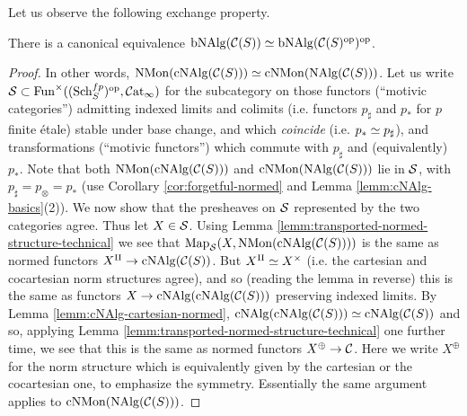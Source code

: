 \documentclass{amsart}
\numberwithin{proposition}{section}
\numberwithin{equation}{section}
\def\NMon{\mathrm{NMon}}
\def\cNMon{\mathrm{cNMon}}
\def\cNAlg{\mathrm{cNAlg}}
\def\bNAlg{\mathrm{bNAlg}}
\begin{document}
Let us observe the following exchange property.
\begin{lemma} \label{lemm:bNAlg-exchange}
There is a canonical equivalence $\bNAlg(\scr C(S)) \wequi \bNAlg(\scr C(S)^\op)^\op$.
\end{lemma}
\begin{proof}
In other words, $\NMon(\cNAlg(\scr C(S))) \wequi \cNMon(\NAlg(\scr C(S)))$.
Let us write $\mathcal S \subset \mathrm{Fun}^\times((\mathrm{S}\mathrm{ch}{}_S^{fp})^{\mathrm{op}}, \mathcal{C}\mathrm{at}{}_\infty)$ for the subcategory on those functors (``motivic categories'') admitting indexed limits and colimits (i.e. functors $p_\sharp$ and $p_*$ for $p$ finite étale) stable under base change, and which \emph{coincide} (i.e. $p_* \simeq p_\sharp$), and transformations (``motivic functors'') which commute with $p_\sharp$ and (equivalently) $p_*$.
Note that both $\NMon(\cNAlg(\scr C(S)))$ and $\cNMon(\NAlg(\scr C(S)))$ lie in $\mathcal S$, with $p_\sharp = p_\otimes = p_*$ (use Corollary \ref{cor:forgetful-normed} and Lemma \ref{lemm:cNAlg-basics}(2)).
We now show that the presheaves on $\mathcal S$ represented by the two categories agree.
Thus let $X \in \mathcal S$.
Using Lemma \ref{lemm:transported-normed-structure-technical} we see that $\Map_{\scr S}(X, \NMon(\cNAlg(\scr C(S))))$ is the same as normed functors $X^\amalg \to \cNAlg(\scr C(S))$.
But $X^\amalg \simeq X^\times$ (i.e. the cartesian and cocartesian norm structures agree), and so (reading the lemma in reverse) this is the same as functors $X \to \cNAlg(\cNAlg(\scr C(S)))$ preserving indexed limits.
By Lemma \ref{lemm:cNAlg-cartesian-normed}, $\cNAlg(\cNAlg(\scr C(S))) \wequi \cNAlg(\scr C(S))$ and so, applying Lemma \ref{lemm:transported-normed-structure-technical} one further time, we see that this is the same as normed functors $X^\oplus \to \mathcal C$.
Here we write $X^\oplus$ for the norm structure which is equivalently given by the cartesian or the cocartesian one, to emphasize the symmetry.
Essentially the same argument applies to $\cNMon(\NAlg(\scr C(S)))$.
\end{proof}
\end{document}
